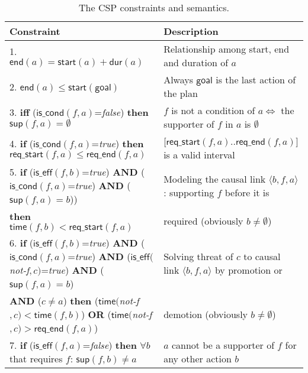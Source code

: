 \documentclass{ecai}
\newcommand{\tup}[1]{{\langle #1 \rangle}}
\newcommand{\dur}{\mathsf{dur}}    %
\newcommand{\iscond}{\mathsf{is\_cond}}    %
\newcommand{\iseff}{\mathsf{is\_eff}}    %
\newcommand{\start}{\mathsf{start}}%
\newcommand{\en}{\mathsf{end}}     %
\newcommand{\supp}{\mathsf{sup}}   %
\newcommand{\tim}{\mathsf{time}}   %
\newcommand{\reqs}{\mathsf{req\_{start}}} %
\newcommand{\reqe}{\mathsf{req\_{end}}}   %
\newcommand{\goal}{\mathsf{goal}}  %
\begin{document}
\begin{table*}
\begin{center}
\caption{The CSP constraints and semantics.}	
\begin{scriptsize}
\begin{tabular}{p{10.4cm}p{6.6cm}} %
\hline
{\bf Constraint}&{\bf Description}\\\hline
			
1. $\en(a)=\start(a)+\dur(a)$ & Relationship among start, end and duration of $a$ \\

2. $\en(a) \leq \start(\goal)$ & Always $\goal$ is the last action of the plan \\

3. \textbf{iff} ($\iscond(f,a)$=\textit{false}) \textbf{then} $\supp(f,a) = \emptyset$ & $f$ is not a condition of $a \iff $ the supporter of $f$ in $a$ is $\emptyset$ \\

4. \textbf{if} ($\iscond(f,a)$=\textit{true}) \textbf{then} $\reqs(f,a) \leq \reqe(f,a)$ & [$\reqs(f,a)..\reqe(f,a)$] is a valid interval\\

5. \textbf{if} ($\iseff(f,b)$=\textit{true}) \textbf{AND} ($\iscond(f,a)$=\textit{true}) \textbf{AND} ($\supp(f,a)=b$))  & Modeling the causal link $\tup{b,f,a}$: supporting $f$ before it is \\
\hspace{0.5cm}\textbf{then} $\tim(f,b) < \reqs(f,a)$ & required (obviously $b \neq \emptyset$) \\

6. \textbf{if} ($\iseff(f,b)$=\textit{true}) \textbf{AND} ($\iscond(f,a)$=\textit{true}) \textbf{AND} ($\iseff($\textit{not-f}$,c)$=\textit{true}) \textbf{AND} ($\supp(f,a)=b$) & Solving threat of $c$ to causal link $\tup{b,f,a}$ by promotion or \\
\hspace{0.5cm}\textbf{AND} ($c \neq a$) \textbf{then} ($\tim($\textit{not-f}$,c) < \tim(f,b)$) \textbf{OR} ($\tim($\textit{not-f}$,c) > \reqe(f,a)$) & demotion (obviously $b \neq \emptyset$) \\

7. \textbf{if} ($\iseff(f,a)$=\textit{false}) \textbf{then} $\forall b$ that requires $f$: $\supp(f,b) \neq a$ & $a$ cannot be a supporter of $f$ for any other action $b$\\


\end{tabular}
\end{scriptsize}
\end{center}
\end{table*}
\end{document}
